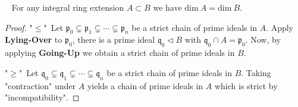 \documentclass[12pt,a4paper,footinclude=true,headinclude=true]{scrbook} %
\newenvironment{corollary}[2][]
{\renewcommand\theinnercustomcol{#2}\innercustomcol[#1]
\begin{mdframed}[backgroundcolor=gray!20]\ }
{\end{mdframed}\endinnercustomcol}
\begin{document}
\begin{corollary}{193}
    For any integral ring extension $A\subset B$ we have $\mathrm{dim}\ A=\mathrm{dim}\ B$.
\end{corollary}
\begin{proof}
    "$\leq$"\ Let $\mathfrak{p}_0\subsetneq\mathfrak{p}_1\subsetneq\cdots\subsetneq\mathfrak{p}_n$ be a strict chain of prime ideals in $A$. Apply \textbf{Lying-Over} to $\mathfrak{p}_0$, there is a prime ideal $\mathfrak{q}_0\triangleleft B$ with $\mathfrak{q}_0\cap A=\mathfrak{p}_0$. Now, by applying \textbf{Going-Up} we obtain a strict chain of prime ideals in $B$.
    \begin{center}
    \end{center}
    "$\geq$"\ Let $\mathfrak{q}_0\subsetneq\mathfrak{q}_1\subsetneq\cdots\subsetneq\mathfrak{q}_n$ be a strict chain of prime ideals in $B$. Taking "contraction" under $A$ yields a chain of prime ideals in $A$ which is strict by "incompatibility".
\end{proof}

\newpage
\end{document}
